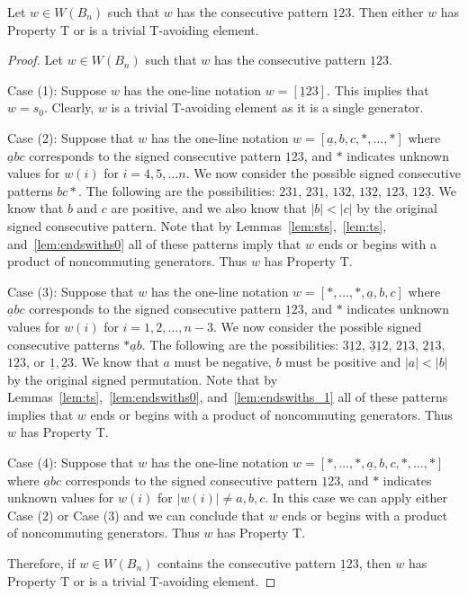 \begin{lemma}\label{lem:123}
Let $w \in W(B_n)$ such that $w$ has the consecutive pattern $\underline{1}23$. Then either $w$ has Property T or is a trivial T-avoiding element.
\begin{proof}
	Let $w \in W(B_n)$ such that $w$ has the consecutive pattern $\underline{1}23$.
	
	Case (1): Suppose $w$ has the one-line notation $w=[\underline{1}23]$. This implies that $w=s_0$. Clearly, $w$ is a trivial T-avoiding element as it is a single generator.
	
	Case (2): Suppose that $w$ has the one-line notation $w=[\underline{a},b,c, \ast, \ldots, \ast]$ where $\underline{a}bc$ corresponds to the signed consecutive pattern $\underline{1}23$, and $\ast$ indicates unknown values for $w(i)$ for $i=4,5, \ldots n$. We now consider the possible signed consecutive patterns $bc \ast$. The following are the possibilities: $231$, $23 \underline{1}$, $132$, $13 \underline{2}$, $123$, $12 \underline{3}$. We know that $b$ and $c$ are positive, and we also know that $|b|<|c|$ by the original signed consecutive pattern. Note that by Lemmas~\ref{lem:sts},~\ref{lem:ts}, and~\ref{lem:endswiths0} all of these patterns imply that $w$ ends or begins with a product of noncommuting generators. Thus $w$ has Property T.
	
	Case (3): Suppose that $w$ has the one-line notation $w=[\ast, \ldots, \ast, \underline{a},b,c]$ where $\underline{a}bc$ corresponds to the signed consecutive pattern $\underline{1}23$, and $\ast$ indicates unknown values for $w(i)$ for $i=1,2, \ldots ,n-3$. We now consider the possible signed consecutive patterns $\ast \underline{a} b$. The following are the possibilities: $3 \underline{1} 2$, $\underline{3} \underline{1} 2$, $2 \underline{1} 3$, $\underline{2} \underline{1} 3$, $1 \underline{2} 3$, or $\underline{1}, \underline{2} 3$. We know that $a$ must be negative, $b$ must be positive and $|a|<|b|$ by the original signed permutation. Note that by Lemmas~\ref{lem:ts},~\ref{lem:endswiths0}, and~\ref{lem:endswiths_1} all of these patterns implies that $w$ ends or begins with a product of noncommuting generators. Thus $w$ has Property T. 
	
	Case (4): Suppose that $w$ has the one-line notation $w=[\ast, \ldots, \ast, \underline{a},b,c, \ast, \ldots, \ast]$ where $\underline{a}bc$ corresponds to the signed consecutive pattern $\underline{1}23$, and $\ast$ indicates unknown values for $w(i)$ for $|w(i)|\neq a,b,c$. In this case we can apply either Case (2) or Case (3) and we can conclude that $w$ ends or begins with a product of noncommuting generators. Thus $w$ has Property T.

	Therefore, if $w \in W(B_n)$ contains the consecutive pattern $\underline{1}23$, then $w$ has Property T or is a trivial T-avoiding element.
\end{proof}	
\end{lemma}

